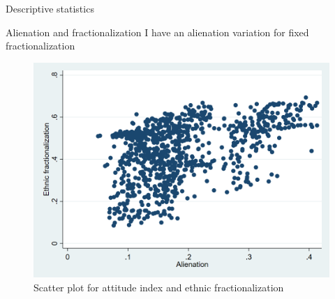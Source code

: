 \documentclass[c]{beamer}  %
\begin{document}
    \begin{frame}{Descriptive statistics}
        \begin{table}[h!]
        \tiny
        \centering
        
        \caption{Descriptive statistic for US cities 2006 - 2017}
        \label{tab:desc}
    \end{table}
    \end{frame}
    
    \begin{frame}{Alienation and fractionalization}
    I have an alienation variation for fixed fractionalization
    \begin{figure}[h]
                \centering
                \includegraphics[scale = 0.2]{Thesis/Figures/frac-index.png}
                \caption{Scatter plot for attitude index and ethnic fractionalization}
                \label{fig:frac-index}
    \end{figure}
    \end{frame}
    
\end{document}
